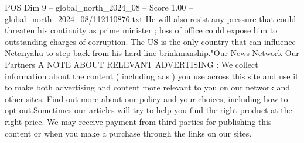 \begin{textsample}{POS Dim 9 – global\_north\_2024\_08 – Score 1.00 – global\_north\_2024\_08/112110876.txt}
He will also resist any pressure that could threaten his continuity as prime minister ; loss of office could expose him to outstanding charges of corruption.
The US is the only country that can influence Netanyahu to step back from his hard-line brinkmanship."Our News Network Our Partners A NOTE ABOUT RELEVANT ADVERTISING : We collect information about the content ( including ads ) you use across this site and use it to make both advertising and content more relevant to you on our network and other sites.
Find out more about our policy and your choices, including how to opt-out.Sometimes our articles will try to help you find the right product at the right price.
We may receive payment from third parties for publishing this content or when you make a purchase through the links on our sites.

\end{textsample}
